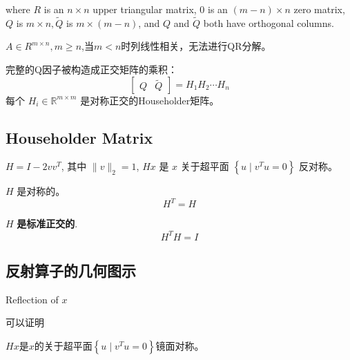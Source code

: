 where $ R $ is an $ n \times n $ upper triangular matrix, $0$ is an $ (m-n) \times n $ zero matrix, $ Q  $ is $ m \times n,\tilde{Q} $ is $ m \times(m-n) $, and $ Q $ and $ \tilde{Q} $ both have orthogonal columns. 

\begin{remark}
    $A \in R^{m \times n}, m \ge n$,当$m < n$时列线性相关，无法进行QR分解。
\end{remark}



完整的Q因子被构造成正交矩阵的乘积：
\begin{equation}
\left[\begin{array}{ll}
Q & \tilde{Q}
\end{array}\right]=H_{1} H_{2} \cdots H_{n}
\end{equation}
每个 $ H_{i} \in \mathbb{R}^{m \times m} $ 是对称正交的Householder矩阵。



\subsection{Householder Matrix}

\begin{theorem}
    $ H=I-2 v v^{T} $, 其中 $ \|v\|_{2}=1 $, $ H x $ 是 $ x $ 关于超平面 $ \left\{u \mid v^{T} u=0\right\} $ 反对称。
\end{theorem}

\begin{theorem}
    $ H $ 是对称的。
    \begin{equation} H^{T}=H \end{equation}
\end{theorem}
    
\begin{theorem}
    $ H $ \textbf{是标准正交的}.
\begin{equation} H^{T} H=I \end{equation}
\end{theorem}

\subsection{反射算子的几何图示}
\begin{FigureCenter}{Reflection of $x$}
    
\end{FigureCenter}

可以证明

\begin{theorem}
    $Hx$是$x$的关于超平面$ \left\{u \mid v^{T} u=0\right\} $镜面对称。
\end{theorem}



